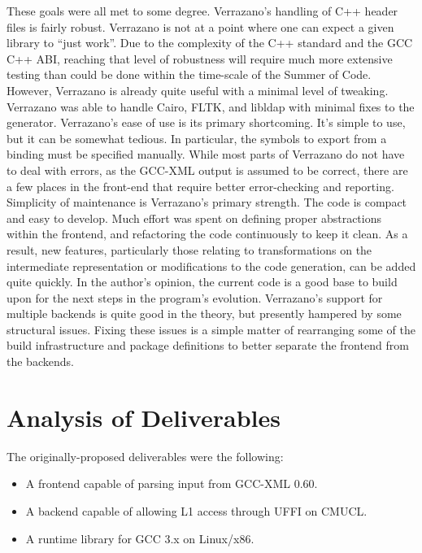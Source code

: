 \documentclass[12pt]{article}
\begin{document}
These goals were all met to some degree. Verrazano's handling of C++ header files is fairly robust. Verrazano is not at a point where one can expect a given library to ``just work''. Due to the complexity of the C++ standard and the GCC C++ ABI, reaching that level of robustness will require much more extensive testing than could be done within the time-scale of the Summer of Code. However, Verrazano is already quite useful with a minimal level of tweaking. Verrazano was able to handle Cairo, FLTK, and libldap with minimal fixes to the generator. Verrazano's ease of use is its primary shortcoming. It's simple to use, but it can be somewhat tedious. In particular, the symbols to export from a binding must be specified manually. While most parts of Verrazano do not have to deal with errors, as the GCC-XML output is assumed to be correct, there are a few places in the front-end that require better error-checking and reporting. Simplicity of maintenance is Verrazano's primary strength. The code is compact and easy to develop. Much effort was spent on defining proper abstractions within the frontend, and refactoring the code continuously to keep it clean. As a result, new features, particularly those relating to transformations on the intermediate representation or modifications to the code generation, can be added quite quickly. In the author's opinion, the current code is a good base to build upon for the next steps in the program's evolution. Verrazano's support for multiple backends is quite good in the theory, but presently hampered by some structural issues. Fixing these issues is a simple matter of rearranging some of the build infrastructure and package definitions to better separate the frontend from the backends. 

\section{Analysis of Deliverables}

The originally-proposed deliverables were the following:

\begin{itemize}
\item A frontend capable of parsing input from GCC-XML 0.60.
\item A backend capable of allowing L1 access through UFFI on CMUCL.
\item A runtime library for GCC 3.x on Linux/x86.
\end{itemize}
\end{document}

